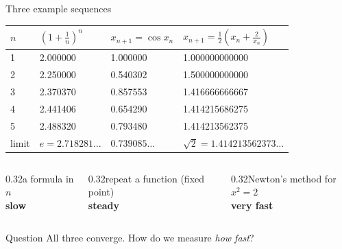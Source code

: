\documentclass[aspectratio=169]{beamer}
\begin{document}
\begin{frame}{Three example sequences}
\centering
\small
\begin{tabular}{llll}
\toprule
$n$ & $\left(1+\frac1n\right)^n$ & $x_{n+1} = \cos x_n$ & $x_{n+1} = \frac12\left(x_n + \frac{2}{x_n}\right)$ \\
\midrule
1 & 2.000000 & 1.000000 & 1.000000000000 \\
2 & 2.250000 & 0.540302 & 1.500000000000 \\
3 & 2.370370 & 0.857553 & 1.416666666667 \\
4 & 2.441406 & 0.654290 & 1.414215686275 \\
5 & 2.488320 & 0.793480 & 1.414213562375 \\
\midrule
limit & $e = 2.718281\ldots$ & $0.739085\ldots$ & $\sqrt 2 = 1.414213562373\ldots$ \\
\bottomrule
\end{tabular}

\vspace{0.4cm}
\begin{columns}[T]
\begin{column}{0.32\textwidth}\centering\scriptsize a formula in $n$\\ \textbf{slow}\end{column}
\begin{column}{0.32\textwidth}\centering\scriptsize repeat a function (fixed point)\\ \textbf{steady}\end{column}
\begin{column}{0.32\textwidth}\centering\scriptsize Newton's method for $x^2 = 2$\\ \textbf{very fast}\end{column}
\end{columns}
\vspace{0.3cm}
\begin{block}{Question}
All three converge. How do we measure \emph{how fast}?
\end{block}
\end{frame}
\end{document}
